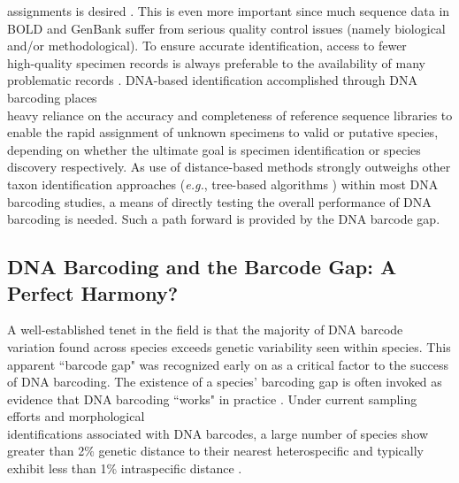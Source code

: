 assignments is desired \cite{doorenweerd2020highly, phillips2019incomplete, phillips2020hacsim, phillips2015exploration}. This is even more important since much sequence data in BOLD and GenBank suffer from serious quality control issues (namely biological and/or methodological). To ensure accurate identification, access to fewer \\ high-quality specimen records is always preferable to the availability of many problematic records \cite{collins2014known}. DNA-based identification accomplished through DNA barcoding places \\ heavy reliance on the accuracy and completeness of reference sequence libraries to enable the rapid assignment of unknown specimens to valid or putative species, depending on whether the ultimate goal is specimen identification or species discovery respectively.  As use of distance-based methods strongly outweighs other taxon identification approaches (\textit{e.g.}, tree-based algorithms \cite{barbera2019epang}) within most DNA barcoding studies, a means of directly testing the overall performance of DNA barcoding is needed. Such a path forward is provided by the DNA barcode gap.  



\subsection{DNA Barcoding and the Barcode Gap: A Perfect Harmony?}

A well-established tenet in the field is that the majority of DNA barcode variation found across species exceeds genetic variability seen within species. This apparent ``barcode gap" \cite{meyer2005dna} was recognized early on as a critical factor to the success of DNA barcoding. The existence of a species' barcoding gap is often invoked as evidence that DNA barcoding ``works" in practice \cite{stoeckle2014dna}. Under current sampling efforts and morphological \\ identifications associated with DNA barcodes, a large number of species show greater than 2\% genetic distance to their nearest heterospecific and typically exhibit less than 1\% intraspecific distance \cite{hubert2015dna}. 



